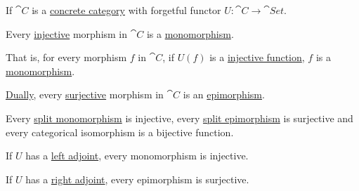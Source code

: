 \begin{proposition}\label{thm:concrete_category_function_invertibility}
  If \( \cat{C} \) is a \hyperref[def:concrete_category]{concrete category} with forgetful functor \( U: \cat{C} \to \cat{Set} \).

  \begin{thmenum}
     Every \hyperref[def:multi_valued_function/empty]{} \hyperref[def:function_invertibility/injective]{injective} morphism in \( \cat{C} \) is a \hyperref[def:morphism_invertibility/left_cancellative]{monomorphism}.

    That is, for every morphism \( f \) in \( \cat{C} \), if \( U(f) \) is a \hyperref[def:multi_valued_function/empty]{} \hyperref[def:function_invertibility/injective]{injective function}, \( f \) is a \hyperref[def:morphism_invertibility/left_cancellative]{monomorphism}.

     \hyperref[thm:categorical_principle_of_duality]{Dually}, every \hyperref[def:function_invertibility/surjective]{surjective} morphism in \( \cat{C} \) is an \hyperref[def:morphism_invertibility/right_cancellative]{epimorphism}.

     Every \hyperref[def:morphism_invertibility/left_invertible]{split monomorphism} is injective, every \hyperref[def:morphism_invertibility/right_cancellative]{split epimorphism} is surjective and every categorical isomorphism is a bijective function.

     If \( U \) has a \hyperref[def:category_adjunction]{left adjoint}, every monomorphism is injective.

     If \( U \) has a \hyperref[def:category_adjunction]{right adjoint}, every epimorphism is surjective.
  \end{thmenum}
\end{proposition}

